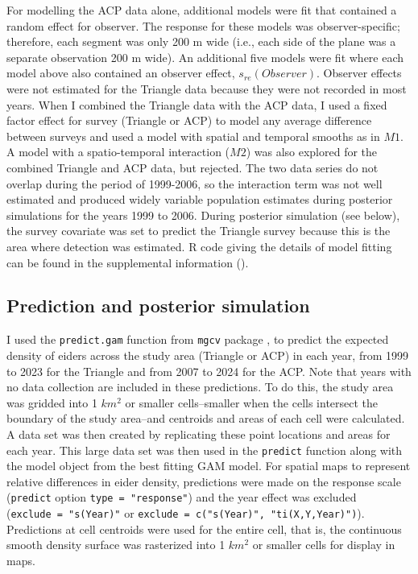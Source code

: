 \documentclass[
  10pt,
  letterpaper,
]{article}
\begin{document}
For modelling the ACP data alone, additional models were fit that
contained a random effect for observer. The response for these models
was observer-specific; therefore, each segment was only 200 m wide
(i.e., each side of the plane was a separate observation 200 m wide). An
additional five models were fit where each model above also contained an
observer effect, \(s_{re}(Observer)\). Observer effects were not
estimated for the Triangle data because they were not recorded in most
years. When I combined the Triangle data with the ACP data, I used a
fixed factor effect for survey (Triangle or ACP) to model any average
difference between surveys and used a model with spatial and temporal
smooths as in \(M1\). A model with a spatio-temporal interaction
(\(M2\)) was also explored for the combined Triangle and ACP data, but
rejected. The two data series do not overlap during the period of
1999-2006, so the interaction term was not well estimated and produced
widely variable population estimates during posterior simulations for
the years 1999 to 2006. During posterior simulation (see below), the
survey covariate was set to predict the Triangle survey because this is
the area where detection was estimated. R code giving the details of
model fitting can be found in the supplemental information
().

\subsection{Prediction and posterior
simulation}\label{prediction-and-posterior-simulation}

I used the \texttt{predict.gam} function from \texttt{mgcv} package
\citep{r-mgcv}, \citep{wood2017} to predict the expected density of
eiders across the study area (Triangle or ACP) in each year, from 1999
to 2023 for the Triangle and from 2007 to 2024 for the ACP. Note that
years with no data collection are included in these predictions. To do
this, the study area was gridded into 1 \(km^2\) or smaller
cells--smaller when the cells intersect the boundary of the study
area--and centroids and areas of each cell were calculated. A data set
was then created by replicating these point locations and areas for each
year. This large data set was then used in the \texttt{predict} function
along with the model object from the best fitting GAM model. For spatial
maps to represent relative differences in eider density, predictions
were made on the response scale (\texttt{predict} option
\texttt{type\ =\ "response"}) and the year effect was excluded
(\texttt{exclude\ =\ "s(Year)"} or
\texttt{exclude\ =\ c("s(Year)",\ "ti(X,Y,Year)")}). Predictions at cell
centroids were used for the entire cell, that is, the continuous smooth
density surface was rasterized into 1 \(km^2\) or smaller cells for
display in maps.
\end{document}
